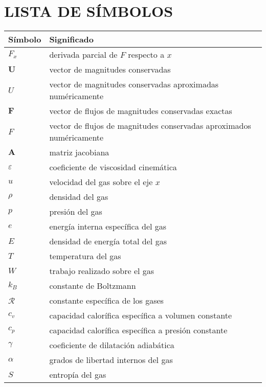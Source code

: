 

\chapter{LISTA DE SÍMBOLOS}

\begin{longtable}{@{}l@{\extracolsep{\fill}} p{4.65in} @{}}  %
  \textsf{Símbolo} & \textsf{Significado}\\[12pt]
  \endhead
  $F_{x}$ & derivada parcial de $F$ respecto a $x$\\
  $\mathbf{U}$ & vector de magnitudes conservadas \\
  ${U}$ & vector de magnitudes conservadas aproximadas numéricamente \\
  $\mathbf{F}$ & vector de flujos de magnitudes conservadas exactas \\
  ${F}$ & vector de flujos de magnitudes conservadas aproximados numéricamente \\
  $\mathbf{A}$ & matriz jacobiana \\
  $\varepsilon$ & coeficiente de viscosidad cinemática\\
  $u$ & velocidad del gas sobre el eje $x$\\
  $\rho$ & densidad del gas\\
  $p$ & presión del gas\\
  $e$ & energía interna específica del gas\\
  $E$ & densidad de energía total del gas\\ 
  $T$ & temperatura del gas \\
  $W$ & trabajo realizado sobre el gas \\
  $k_B$ & constante de Boltzmann \\
  $\mathcal{R}$ & constante específica de los gases\\
  $c_v$ & capacidad calorífica específica a volumen constante\\
  $c_p$ & capacidad calorífica específica a presión constante\\
  $\gamma$ & coeficiente de dilatación adiabática\\
  $\alpha$ & grados de libertad internos del gas\\
  $S$ & entropía del gas
\end{longtable}
